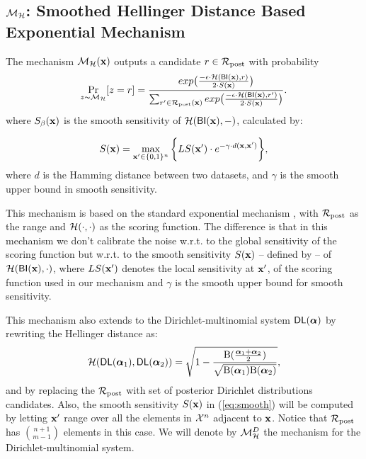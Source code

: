 \documentclass{article}
\begin{document}
\subsection{$\mathcal{M}_{\mathcal{H}}$: Smoothed Hellinger Distance Based Exponential Mechanism}
\label{subsec_hexpmech}

\begin{definition}
\label{def_smoo}
The mechanism $\mathcal{M}_{\mathcal{H}}(\textbf{x})$ outputs a candidate $r \in \mathcal{R}_{\textup{post}}$ with probability
\begin{equation*}
\underset{z \thicksim \mathcal{M}_{\mathcal{H}}}{\Pr}[z=r] = \frac {exp\big(\frac{-\epsilon\cdot\mathcal{H}(\mathsf{BI}(\textbf{x}),r)}{2\cdot S(\textbf{x})}\big)}
{\sum_{r'\in \mathcal{R}_{\textup{post}}(\textbf{x})} exp \big(\frac{-\epsilon\cdot \mathcal{H} (\mathsf{BI}(\textbf{x}),r')}{2 \cdot S(\textbf{x})}\big)}.
\end{equation*}
where $S_\beta(\textbf{x})$ is the smooth sensitivity of $\mathcal{H}(\mathsf{BI}(\textbf{x}),-)$, calculated by:

\begin{equation}
  \label{eq:smooth}
   S(\textbf{x})=\max_{\textbf{x}' \in \{0,1\}^{n}}\bigg \{LS(\textbf{x}') \cdot e^{-\gamma\cdot d(\textbf{x},\textbf{x}')}\bigg\},
\end{equation}
where $d$ is the Hamming distance between two datasets, and $\gamma$ is the smooth upper bound in smooth sensitivity.
\end{definition}

This mechanism is based on the standard exponential mechanism
\cite{talwar}, with $\mathcal{R}_{\textup{post}}$ as the range and
$\mathcal{H}(\cdot,\cdot)$ as the scoring function. The difference is
that in this mechanism we don't calibrate the noise w.r.t. to the
global sensitivity of the scoring function but w.r.t. to the smooth
sensitivity $S(\textbf{x})$ -- defined by \cite{nissim2007smooth}-- of
$\mathcal{H}(\mathsf{BI}(\textbf{x}), \cdot)$, where $LS(\textbf{x}')$ denotes the local
sensitivity at $\textbf{x}'$, of the scoring function used in our mechanism and  $\gamma$ is the smooth upper bound for smooth sensitivity.

This mechanism also extends to the Dirichlet-multinomial system $\mathsf{DL}(\boldsymbol{\alpha})$ by rewriting the Hellinger distance as:
\[
  \mathcal{H}(\mathsf{DL}(\boldsymbol{\alpha}_1), \mathsf{DL}(\boldsymbol{\alpha}_2)) = \sqrt{1 - \frac{\textup{B}(\frac{\boldsymbol{\alpha}_1 + \boldsymbol{\alpha}_2}{2})}{\sqrt{\textup{B}(\boldsymbol{\alpha}_1) \textup{B}(\boldsymbol{\alpha}_2)}}},
\]
and by replacing the $\mathcal{R}_{\textup{post}}$ with set of posterior Dirichlet
distributions candidates. Also, the smooth sensitivity $S(\textbf{x})$
in (\ref{eq:smooth}) will be computed by letting $\textbf{x}'$ range
over all the elements in $\mathcal{X}^{n}$ adjacent to $\textbf{x}$. Notice
that $\mathcal{R}_{\textup{post}}$ has $\binom{n + 1}{m - 1}$ elements in this case. We
will denote by $\mathcal{M}^{D}_{\mathcal{H}}$ the mechanism for the
Dirichlet-multinomial system.
\end{document}
